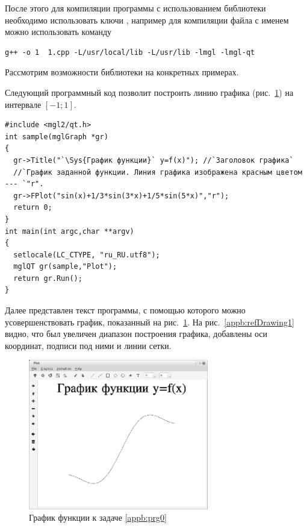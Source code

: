 После этого для компиляции программы с использованием библиотеки  необходимо использовать ключи , например для компиляции файла с именем  можно использовать команду
\begin{verbatim}
g++ -o 1  1.cpp -L/usr/local/lib -L/usr/lib -lmgl -lmgl-qt
\end{verbatim}

Рассмотрим возможности библиотеки на конкретных примерах.


Следующий программный код позволит построить линию графика (рис.~\ref{appb:refDrawing0}) на интервале $[-1;1]$.
\begin{lstlisting}
#include <mgl2/qt.h>
int sample(mglGraph *gr)
{
  gr->Title("`\Sys{График функции}` y=f(x)"); //`Заголовок графика`
  //`График заданной функции. Линия графика изображена красным цветом --- `"r".
  gr->FPlot("sin(x)+1/3*sin(3*x)+1/5*sin(5*x)","r");
  return 0;
}
int main(int argc,char **argv)
{
  setlocale(LC_CTYPE, "ru_RU.utf8");
  mglQT gr(sample,"Plot");
  return gr.Run();
}
\end{lstlisting}

Далее представлен текст программы, с помощью которого можно усовершенствовать график, показанный на рис.~\ref{appb:refDrawing0}. 
На рис.~\ref{appb:refDrawing1} видно, что был увеличен диапазон построения графика, добавлены оси координат,
подписи под ними и линии сетки.

\begin{figure}[htb]
\begin{center}
\includegraphics[width=0.7\textwidth]{img/ris_appb_1}
\caption{График функции к задаче \ref{appb:prg0}}
\label{appb:refDrawing0}
\end{center}
\end{figure}

